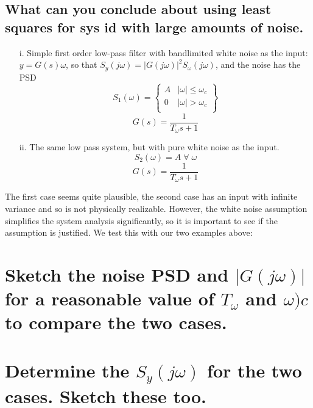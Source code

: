 \documentclass[12pt,letterpaper, onecolumn]{exam}
\begin{document}
\begin{questions}
\begin{parts}
        \part{What can you conclude about using least squares for sys id with large amounts of noise.}

    \end{parts}
    \clearpage
    \begin{itemize}
        \item[i.]{Simple first order low-pass filter with bandlimited white noise as the input:
        $y = G(s)\omega$, so that $S_y(j\omega) = \left\vert G(j\omega) \right\vert^2S_{\omega}(j\omega)$, and the noise has the PSD
        \[S_1(\omega) =
            \begin{Bmatrix}
                A & \vert \omega \vert \leq \omega_c \\
                0 & \vert \omega \vert > \omega_c    \\
            \end{Bmatrix} \]
        \[G(s) = \frac{1}{T_{\omega}s + 1} \]
        }
        \item[ii.]{The same low pass system, but with pure white noise as the input.
                    \[S_2(\omega) = A\;\forall\;\omega   \]
                    \[G(s) = \frac{1}{T_{\omega}s + 1} \]
              }
    \end{itemize}
    The first case seems quite plausible, the second case has an input with infinite variance and so is not physically realizable. However, the white noise assumption simplifies the system analysis significantly, so it is important to see if the assumption is justified. We test this with our two examples above:
    \begin{parts}
        \part{Sketch the noise PSD and $\vert G(j\omega)\vert$ for a reasonable value of $T_\omega$ and $\omega)c$ to compare the two cases.}

        \solution{}

        \part{Determine the $S_y(j\omega)$ for the two cases. Sketch these too.}


\end{parts}
\end{questions}
\end{document}
